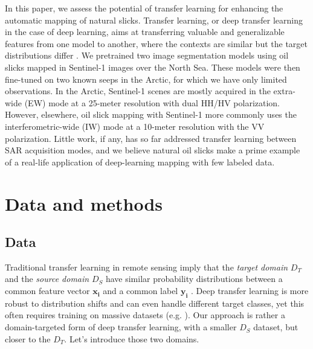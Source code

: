 \documentclass[journal]{IEEEtran}
\begin{document}
In this paper, we assess the potential of transfer learning for enhancing the automatic mapping of natural slicks. Transfer learning, or deep transfer learning in the case of deep learning, aims at 
transferring valuable and generalizable features from one model to another, where the contexts are similar but the target distributions differ \cite{goodfellowDeepLearning2016}. 
We pretrained two image segmentation models using oil slicks mapped in Sentinel-1 images over the North Sea. These models were then fine-tuned on two known seeps in the Arctic, for which we have only 
limited observations. In the Arctic, Sentinel-1 scenes are mostly acquired in the extra-wide (EW) mode at a 25-meter resolution with dual HH/HV polarization. However, elsewhere, oil slick mapping with 
Sentinel-1 more commonly uses the interferometric-wide (IW) mode at a 10-meter resolution with the VV polarization.
Little work, if any, has so far addressed transfer learning between SAR acquisition modes, and we believe natural oil slicks make a 
prime example of a real-life application of deep-learning mapping with few labeled data. 

\section{Data and methods}
\subsection{Data}
Traditional transfer learning in remote sensing imply that the \textit{target domain} $\mathit{D}_T$ and the \textit{source domain} $\mathit{D}_S$ have similar probability distributions 
between a common feature vector $\mathbf{x_i}$ and a common label $\mathbf{y_i}$ \cite{tuiaDomainAdaptationClassification2016}. Deep transfer learning is more robust to distribution shifts 
and can even handle different target classes, yet this often requires training on massive datasets (e.g. \cite{heDeepResidualLearning2015,kirillovSegmentAnything2023}). 
Our approach is rather a domain-targeted form of deep transfer learning, with a smaller $\mathit{D}_S$ dataset, but closer to the $\mathit{D}_T$. Let's introduce those two domains.
\end{document}
